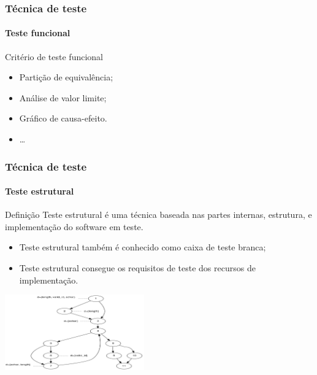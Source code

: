 \begin{frame}
\frametitle{Técnica de teste}
\framesubtitle{Teste funcional}

\begin{block:fact}{Critério de teste funcional}
\begin{itemize}
	\item Partição de equivalência;
	\item Análise de valor limite;
	\item Gráfico de causa-efeito.
	\item \ldots
\end{itemize}
\end{block:fact}
\end{frame}



\begin{frame}
\frametitle{Técnica de teste}
\framesubtitle{Teste estrutural}

\begin{block:concept}{Definição}
Teste estrutural é uma técnica baseada nas partes internas, estrutura, e implementação do software em teste.
\end{block:concept}


\begin{block:fact}{}
\begin{itemize}
	\item Teste estrutural também é conhecido como caixa de teste branca;

	\item Teste estrutural consegue os requisitos de teste dos recursos de implementação.
\end{itemize}
\end{block:fact}

\begin{block:fact}{}
    \centering
    \includegraphics[width=6cm]{teste-de-software/conceitos-basicos/Imagens/structural-testing}
\end{block:fact}
\end{frame}


